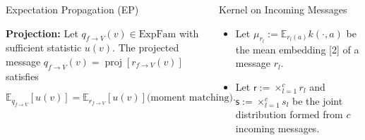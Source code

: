 \documentclass[english]{beamer}
\DeclareMathOperator*{\proj}{\text{proj}} %
\begin{document}
\begin{frame}
\begin{columns}[t]
\begin{block}{Expectation Propagation (EP)}
\begin{figure}[ht]
\centering
\end{figure}
%
\vspace{1cm}
\textbf{Projection:} Let $q_{f\rightarrow V}(v)\in\text{ExpFam}$
with sufficient statistic $u(v)$. The projected message $q_{f\rightarrow
V}(v)=\proj\left[r_{f\rightarrow V}(v)\right]$
satisfies 

\[ \mathbb{E}_{q_{f\rightarrow V}}\left[u(v)\right]=\mathbb{E}_{r_{f\rightarrow
V}}\left[u(v)\right] \text{(moment matching).} \]

%
\end{block}


\begin{block}{Kernel on Incoming Messages}

\begin{itemize}
    \item Let $\mu_{r_{l}}:=\mathbb{E}_{r_{l}(a)}k(\cdot,a)$ be the mean
        embedding [2] of a message $r_{l}$. 
    \item Let $\mathsf{r}:=\times_{l=1}^c r_{l}$ and
        $\mathsf{s}:=\times_{l=1}^c s_{l}$ be the joint distribution formed
        from $c$ incoming messages.
\end{itemize}
%
\vspace{3mm}


\end{block}
\end{columns}
\end{frame}
\end{document}
